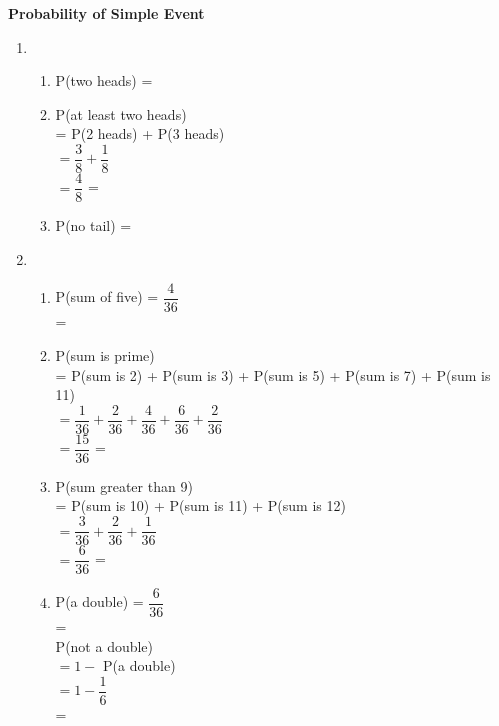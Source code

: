 \begin{center}
\textbf{Probability of Simple Event}\\
\end{center}

\vspace*{1ex}

\begin{multicols}{2}

\begin{enumerate}[label = \arabic*. ]
\item %
\begin{enumerate}[label = \alph*. ]
\item P(two heads) = \redcheck  
\item P(at least two heads) \\
= P(2 heads) + P(3 heads) \redcheck \\
$ =\dfrac{3}{8}+\dfrac{1}{8}$ \redcheck \\
$ = \dfrac{4}{8}$ \redcheck %
= \redcheck 
 
\item P(no tail) = \redcheck  

\end{enumerate} 
\item %
\begin{enumerate}[label = \alph*. ]
\item P(sum of five) = $\dfrac{4}{36}$ \redcheck \\
= \redcheck 
\item P(sum is prime)\\ 
= P(sum is 2) + P(sum is 3) + P(sum is 5) + P(sum is 7) + P(sum is 11) \redcheck \\
$= \dfrac{1}{36} + \dfrac{2}{36} + \dfrac{4}{36} + \dfrac{6}{36} + \dfrac{2}{36} $ \redcheck \\
$=\dfrac{15}{36}$ \redcheck %
= \redcheck
\item P(sum greater  than 9) \\
= P(sum is 10) + P(sum is 11) + P(sum is 12) \redcheck \\
$= \dfrac{3}{36} + \dfrac{2}{36} + \dfrac{1}{36} $ \redcheck \\
$=\dfrac{6}{36}$ \redcheck %
= \redcheck
\item P(a double) = $\dfrac{6}{36}$ \redcheck \\
= \redcheck \\
P(not a double) \\
$= 1 - $ P(a double) \redcheck \\
$ = 1 - \dfrac{1}{6} $ \redcheck \\
= \redcheck 
 

\end{enumerate}
\end{enumerate}
\end{multicols}
